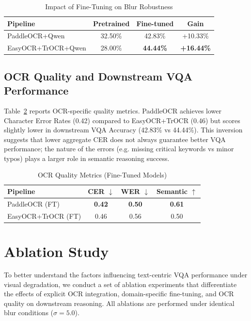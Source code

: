 \documentclass[conference]{IEEEtran}
\begin{document}
\begin{table}[t]
\centering
\caption{Impact of Fine-Tuning on Blur Robustness}
\label{tab:finetuning}
\begin{tabular}{lccc}
\toprule
Pipeline & Pretrained & Fine-tuned & Gain \\
\midrule
PaddleOCR+Qwen & 32.50\% & 42.83\% & +10.33\% \\
EasyOCR+TrOCR+Qwen & 28.00\% & \textbf{44.44\%} & \textbf{+16.44\%} \\
\bottomrule
\end{tabular}
\end{table}

\subsection{OCR Quality and Downstream VQA Performance}

Table~\ref{tab:ocr_quality} reports OCR-specific quality metrics. PaddleOCR achieves lower Character Error Rates (0.42) compared to EasyOCR+TrOCR (0.46) but scores slightly lower in downstream VQA Accuracy (42.83\% vs 44.44\%). This inversion suggests that lower aggregate CER does not always guarantee better VQA performance; the nature of the errors (e.g. missing critical keywords vs minor typos) plays a larger role in semantic reasoning success.

\begin{table}[t]
\centering
\caption{OCR Quality Metrics (Fine-Tuned Models)}
\label{tab:ocr_quality}
\begin{tabular}{lccc}
\toprule
Pipeline & CER $\downarrow$ & WER $\downarrow$ & Semantic $\uparrow$ \\
\midrule
PaddleOCR (FT) & \textbf{0.42} & \textbf{0.50} & \textbf{0.61} \\
EasyOCR+TrOCR (FT) & 0.46 & 0.56 & 0.50 \\
\bottomrule
\end{tabular}
\end{table}

\section{Ablation Study}

To better understand the factors influencing text-centric VQA performance under visual degradation, we conduct a set of ablation experiments that differentiate the effects of explicit OCR integration, domain-specific fine-tuning, and OCR quality on downstream reasoning. All ablations are performed under identical blur conditions ($\sigma = 5.0$).
\end{document}
